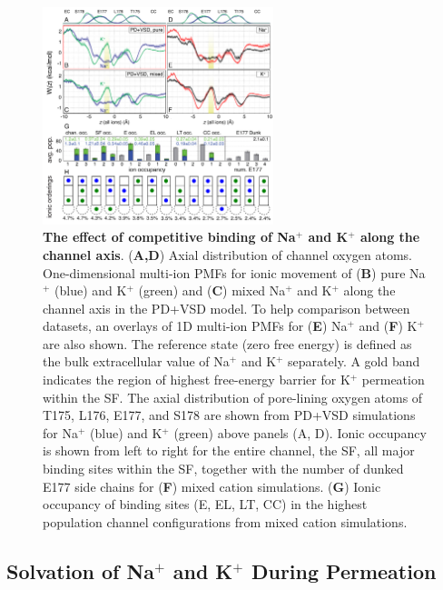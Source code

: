 \begin{refsection}
\begin{figure}[!htb]
\centering
\includegraphics[width=0.6\textwidth]{nav2/Nav2Fig4}
\caption[The effect of competitive binding of Na$^+$ and K$^+$ along the channel axis]{\textbf{The effect of competitive binding of Na$^+$ and K$^+$ along the channel axis}. (\textbf{A,D}) Axial distribution of channel oxygen atoms. One-dimensional multi-ion PMFs for ionic movement of (\textbf{B}) pure Na$^+$ (blue) and K$^+$ (green) and (\textbf{C}) mixed Na$^+$ and K$^+$ along the channel axis in the PD+VSD model. To help comparison between datasets, an overlays of 1D multi-ion PMFs for (\textbf{E}) Na$^+$ and (\textbf{F}) K$^+$ are also shown. The reference state (zero free energy) is defined as the bulk extracellular value of Na$^+$ and K$^+$ separately. A gold band indicates the region of highest free-energy barrier for K$^+$ permeation within the SF. The axial distribution of pore-lining oxygen atoms of T175, L176, E177, and S178 are shown from PD+VSD simulations for Na$^+$ (blue) and K$^+$ (green) above panels (A, D). Ionic occupancy is shown from left to right for the entire channel, the SF, all major binding sites within the SF, together with the number of dunked E177 side chains for (\textbf{F}) mixed cation simulations. (\textbf{G}) Ionic occupancy of binding sites (E, EL, LT, CC) in the highest population channel configurations from mixed cation simulations.}
\label{fig:nav2fig4}
\end{figure}

\subsection{Solvation of Na$^+$ and K$^+$ During Permeation}


\end{refsection}
